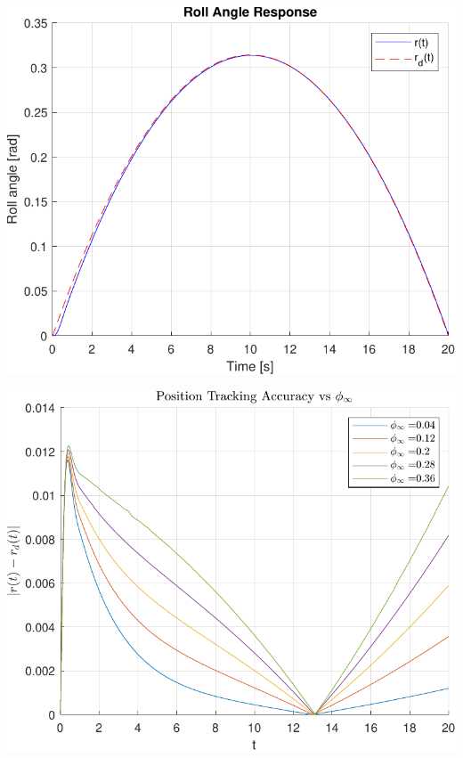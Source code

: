 \documentclass[a4paper,12pt]{article}
\begin{document}
\begin{minipage}[t]{0.45\textwidth}
    \centering
    \includegraphics[width=\linewidth]{plot/task2_roll_angle_response.pdf}
    \label{fig:task2_roll_angle_response}
\end{minipage}%
\hfill
\begin{minipage}[t]{0.45\textwidth}
    \centering
    \includegraphics[width=\linewidth]{plot/task2_position_tracking_accuracy_vs_phi_infty.pdf}
    \label{fig:task2_position_tracking_accuracy_vs_phi_infty}
\end{minipage}
\end{document}
